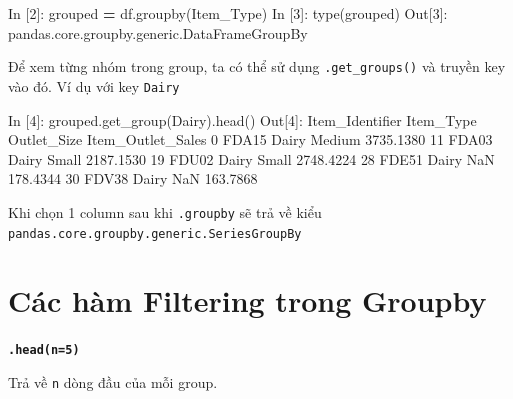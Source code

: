 \documentclass[
]{book}
\newenvironment{Shaded}{\begin{snugshade}}{\end{snugshade}}
\newcommand{\BuiltInTok}[1]{#1}
\newcommand{\DecValTok}[1]{\textcolor[rgb]{0.00,0.00,0.81}{#1}}
\newcommand{\FloatTok}[1]{\textcolor[rgb]{0.00,0.00,0.81}{#1}}
\newcommand{\NormalTok}[1]{#1}
\newcommand{\OperatorTok}[1]{\textcolor[rgb]{0.81,0.36,0.00}{\textbf{#1}}}
\newcommand{\StringTok}[1]{\textcolor[rgb]{0.31,0.60,0.02}{#1}}
\begin{document}
\begin{Shaded}
\begin{Highlighting}[]
\NormalTok{In [}\DecValTok{2}\NormalTok{]: grouped }\OperatorTok{=}\NormalTok{ df.groupby(}\StringTok{\textquotesingle{}Item\_Type\textquotesingle{}}\NormalTok{)}
\NormalTok{In [}\DecValTok{3}\NormalTok{]: }\BuiltInTok{type}\NormalTok{(grouped)}
\NormalTok{Out[}\DecValTok{3}\NormalTok{]:}
\NormalTok{pandas.core.groupby.generic.DataFrameGroupBy}
\end{Highlighting}
\end{Shaded}

Để xem từng nhóm trong group, ta có thể sử dụng \texttt{.get\_groups()} và truyền key vào đó. Ví dụ với key \texttt{Dairy}

\begin{Shaded}
\begin{Highlighting}[]
\NormalTok{In [}\DecValTok{4}\NormalTok{]: grouped.get\_group(}\StringTok{\textquotesingle{}Dairy\textquotesingle{}}\NormalTok{).head()}
\NormalTok{Out[}\DecValTok{4}\NormalTok{]:}
\NormalTok{   Item\_Identifier Item\_Type Outlet\_Size  Item\_Outlet\_Sales}
\DecValTok{0}\NormalTok{            FDA15     Dairy      Medium          }\FloatTok{3735.1380}
\DecValTok{11}\NormalTok{           FDA03     Dairy       Small          }\FloatTok{2187.1530}
\DecValTok{19}\NormalTok{           FDU02     Dairy       Small          }\FloatTok{2748.4224}
\DecValTok{28}\NormalTok{           FDE51     Dairy         NaN           }\FloatTok{178.4344}
\DecValTok{30}\NormalTok{           FDV38     Dairy         NaN           }\FloatTok{163.7868}
\end{Highlighting}
\end{Shaded}

Khi chọn 1 column sau khi \texttt{.groupby} sẽ trả về kiểu \texttt{pandas.core.groupby.generic.SeriesGroupBy}

\section{Các hàm Filtering trong Groupby}\label{cuxe1c-huxe0m-filtering-trong-groupby}

\textbf{\texttt{.head(n=5)}}

Trả về \texttt{n} dòng đầu của mỗi group.
\end{document}
